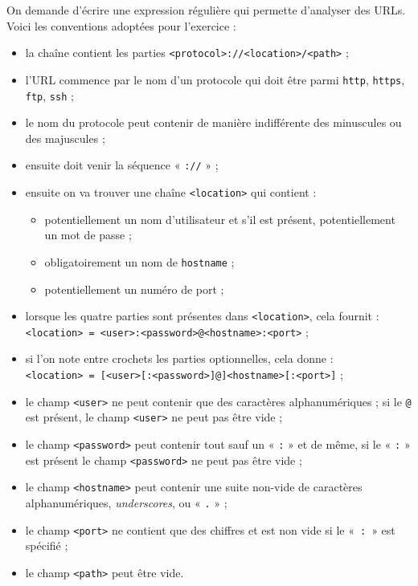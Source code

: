 \begin{exercise}[title=Décortiquer une URL, level=advanced]
On demande d'écrire une expression régulière qui permette d'analyser des URLs.
Voici les conventions adoptées pour l'exercice :
\begin{itemize}
\item la chaîne contient les parties \texttt{<protocol>://<location>/<path>} ;
\item l'URL commence par le nom d'un protocole qui doit être parmi \texttt{http}, \texttt{https}, \texttt{ftp}, \texttt{ssh} ;
\item le nom du protocole peut contenir de manière indifférente des minuscules ou des majuscules ;
\item ensuite doit venir la séquence « \texttt{://} » ;
\item ensuite on va trouver une chaîne \texttt{<location>} qui contient :
	\begin{itemize}\jazzitem
  	\item potentiellement un nom d'utilisateur et s'il est présent, potentiellement un mot de passe ;
    \item obligatoirement un nom de \texttt{hostname} ;
    \item potentiellement un numéro de port ;
  \end{itemize}
\item lorsque les quatre parties sont présentes dans \texttt{<location>}, cela fournit : 
	\texttt{<location> = <user>:<password>@<hostname>:<port>} ;
\item si l'on note entre crochets les parties optionnelles, cela donne :\\
	\texttt{<location> = [<user>[:<password>]@]<hostname>[:<port>]} ;
\item le champ \texttt{<user>} ne peut contenir que des caractères alphanumériques ; si le \texttt{@} est présent, le champ \texttt{<user>} ne peut pas être vide ;
\item le champ \texttt{<password>} peut contenir tout sauf un « \texttt{:} » et de même, si le « \texttt{:} » est présent le champ \texttt{<password>} ne peut pas être vide ;
\item le champ \texttt{<hostname>} peut contenir une suite non-vide de caractères alphanumériques, \textit{underscores}, ou « \texttt{.} » ;
\item le champ \texttt{<port>} ne contient que des chiffres et est non vide si le «~\texttt{:}~» est spécifié ;
\item le champ \texttt{<path>} peut être vide.
\end{itemize}



\end{exercise}

